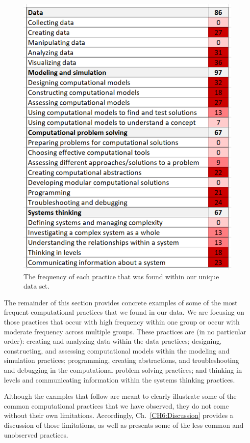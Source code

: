 \documentclass{msuphddissertation}
\begin{document}
\begin{doublespace}
\begin{figure}\centering
\includegraphics[scale=0.65]{./images/CH5DensityPlot.pdf}
\caption{The frequency of each practice that was found within our unique data set.}\label{CH5:DensityPlot}
\end{figure}

The remainder of this section provides concrete examples of some of the most frequent computational practices that we found in our data.  We are focusing on those practices that occur with high frequency within one group or occur with moderate frequency across multiple groups.  These practices are (in no particular order): creating and analyzing data within the data practices; designing, constructing, and assessing computational models within the modeling and simulation practices; programming, creating abstractions, and troubleshooting and debugging in the computational problem solving practices; and thinking in levels and communicating information within the systems thinking practices.

Although the examples that follow are meant to clearly illustrate some of the common computational practices that we have observed, they do not come without their own limitations.  Accordingly, Ch.~\ref{CH6:Discussion} provides a discussion of those limitations, as well as presents some of the less common and unobserved practices.


\end{doublespace}
\end{document}
